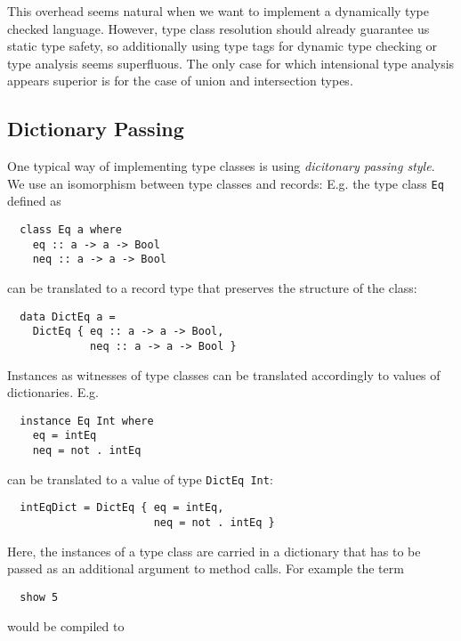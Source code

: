 This overhead seems natural when we want to implement a dynamically type checked language.
However, type class resolution should already guarantee us static type safety, so additionally using type tags for dynamic type checking or type analysis seems superfluous.
The only case for which intensional type analysis appears superior is for the case of union and intersection types.


\subsection{Dictionary Passing}
\label{sec:dictionaryPassing}

One typical way of implementing type classes is using \emph{dicitonary passing style}.
We use an isomorphism between type classes and records:
E.g. the type class \texttt{Eq} defined as

\begin{verbatim}
  class Eq a where
    eq :: a -> a -> Bool
    neq :: a -> a -> Bool
\end{verbatim}

can be translated to a record type that preserves the structure of the class:

\begin{verbatim}
  data DictEq a =
    DictEq { eq :: a -> a -> Bool,
             neq :: a -> a -> Bool }
\end{verbatim}

Instances as witnesses of type classes can be translated accordingly to values of dictionaries.
E.g.

\begin{verbatim}
  instance Eq Int where
    eq = intEq
    neq = not . intEq  
\end{verbatim}

can be translated to a value of type \texttt{DictEq Int}:

\begin{verbatim}
  intEqDict = DictEq { eq = intEq,
                       neq = not . intEq }
\end{verbatim}

Here, the instances of a type class are carried in a dictionary that has to be passed as an additional argument to method calls.
For example the term

\begin{verbatim}
  show 5
\end{verbatim}

would be compiled to

